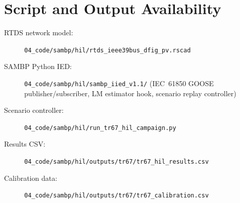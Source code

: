 \documentclass[11pt, a4paper]{article}
\begin{document}
\appendix
\section{Script and Output Availability}
\label{app:code}

\begin{description}
  \item[RTDS network model:]
    \texttt{04\_code/sambp/hil/rtds\_ieee39bus\_dfig\_pv.rscad}
  \item[SAMBP Python IED:]
    \texttt{04\_code/sambp/hil/sambp\_iied\_v1.1/}
    (IEC~61850 GOOSE publisher/subscriber, LM estimator hook,
    scenario replay controller)
  \item[Scenario controller:]
    \texttt{04\_code/sambp/hil/run\_tr67\_hil\_campaign.py}
  \item[Results CSV:]
    \texttt{04\_code/sambp/hil/outputs/tr67/tr67\_hil\_results.csv}
  \item[Calibration data:]
    \texttt{04\_code/sambp/hil/outputs/tr67/tr67\_calibration.csv}
\end{description}



\end{document}
